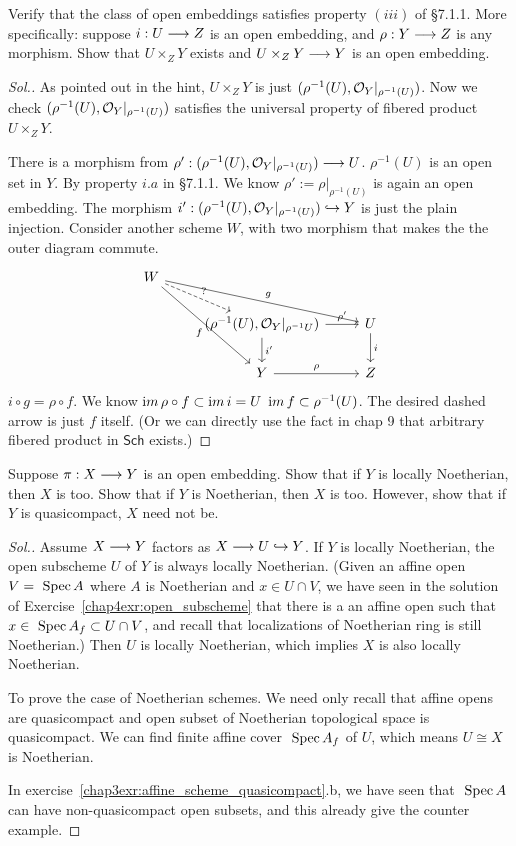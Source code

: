 \documentclass[11pt]{book} %
\begin{document}
\begin{exr}
Verify that the class of open embeddings satisfies property $(iii)$ of \S 7.1.1. More specifically: suppose $i:U\longrightarrow Z$ is an open embedding, and $\rho:Y\longrightarrow Z$ is any morphism. Show that $U\times_Z Y$ exists and $U\times_Z Y\longrightarrow Y$ is an open embedding. 
\end{exr}
\begin{proof}[Sol.]
As pointed out in the hint, $U\times_Z Y$ is just $(\rho^{-1}(U),{\cal O}_Y|_{\rho^{-1}(U)})$. Now we check $(\rho^{-1}(U),{\cal O}_Y|_{\rho^{-1}(U)})$ satisfies the universal property of fibered product $U\times_Z Y$.

There is a morphism from $\rho':(\rho^{-1}(U),{\cal O}_Y|_{\rho^{-1}(U)})\longrightarrow U$. $\rho^{-1}(U)$ is an open set in $Y$. By property $i.a$ in \S 7.1.1. We know $\rho':=\rho|_{\rho^{-1}(U)}$ is again an open embedding. The morphism $i':(\rho^{-1}(U),{\cal O}_Y|_{\rho^{-1}(U)})\hookrightarrow Y$ is just the plain injection. Consider another scheme $W$, with two morphism that makes the the outer diagram commute.
$$
\begin{tikzcd}
W \arrow[rdd, "f"'] \arrow[rrd, "g"] \arrow[rd, "?", dashed] &  &  \\
 & {(\rho^{-1}(U),\calo_Y|_{\rho^{-1}U})} \arrow[d, "i'"] \arrow[r, "\rho'"] & U \arrow[d, "i"] \\
 & Y \arrow[r, "\rho"] & Z
\end{tikzcd}
$$
$i\circ g=\rho\circ f$. We know ${\text im\thinspace} \rho\circ f\subset {\text im\thinspace} i=U $ ${\text im\thinspace} f\subset \rho^{-1}(U)$. The desired dashed arrow is just $f$ itself. (Or we can directly use the fact in chap 9 that arbitrary fibered product in $\mathsf{Sch}$ exists.)
\end{proof}
\begin{exr}
Suppose $\pi:X\longrightarrow Y$ is an open embedding. Show that if $Y$ is locally Noetherian, then $X$ is too. Show that if $Y$ is Noetherian, then $X$ is too. However, show that if $Y$ is quasicompact, $X$ need not be.
\end{exr}
\begin{proof}[Sol.]
Assume $X\longrightarrow Y$ factors as $X\longrightarrow U\hookrightarrow Y$.
If $Y$ is locally Noetherian, the  open subscheme $U$ of $Y$ is always locally Noetherian. (Given an affine open $V=\text{ Spec\,} A$  where $A$ is Noetherian and $x\in U\cap V$, we have seen in the solution of Exercise~\ref{chap4exr:open_subscheme} that there is a an affine open  such that $x\in \text{ Spec\,} A_f\subset U\cap V$, and recall that localizations of Noetherian ring is still Noetherian.) Then $U$ is locally Noetherian, which implies $X$ is also locally Noetherian.

To prove the case of Noetherian schemes. We need only recall that affine opens are quasicompact and open subset of Noetherian topological space is quasicompact. We can find finite affine cover $\text{ Spec\,} A_f$ of $U$, which means $U\cong X$ is Noetherian.

In exercise~\ref{chap3exr:affine_scheme_quasicompact}.b, we have seen that $\text{ Spec\,} A$ can have non-quasicompact open subsets, and this already give the counter example.  
\end{proof}
\end{document}
